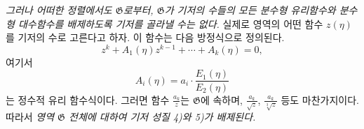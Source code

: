 
\emph{그러나 어떠한 정렬에서도 $\mathfrak G$로부터, $\mathfrak G$가 기저의 수들의 모든 분수형 유리함수와 분수형 대수함수를 배제하도록 기저를 골라낼 수는 없다.} 실제로 영역의 어떤 함수 $z(\eta)$를 기저의 수로 고른다고 하자. 이 함수는 다음 방정식으로 정의된다.
\[
 z^k+A_1(\eta)z^{k-1}+\cdots+A_k(\eta)=0,
\]
여기서
\[
 A_i(\eta)=a_i\cdot\frac{E_1(\eta)}{E_2(\eta)}
\]
는 정수적 유리 함수식이다. 그러면 함수 $\frac{a_k}{z}$는 $\mathfrak G$에 속하며, $\frac{a_k}{\sqrt z}$, $\frac{a_k}{\sqrt[3]z}$ 등도 마찬가지이다. 따라서 \emph{영역 $\mathfrak G$ 전체에 대하여 기저 성질 4)와 5)가 배제된다.}
